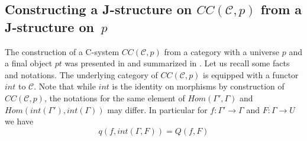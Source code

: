 \documentclass[12pt]{article}
\numberwithin{equation}{section}
\newenvironment{eq}{\begin{equation}}{\end{equation}}
\newcommand{\llabel}[1]{\label{#1}}
\newcommand{\sr}{\rightarrow}
\newcommand{\toCC}{CC} %
\begin{document}
\subsection{Constructing a J-structure on $\toCC({\mathcal C},p)$ from a J-structure on~$p$}
%
The construction of a C-system $\toCC({\mathcal C},p)$ from a category with a
universe $p$ and a final object $pt$ was presented in \cite{Cfromauniverse} and
summarized in \cite{fromunivwithPi}. Let us recall some facts and
notations. The underlying category of $\toCC({\mathcal C},p)$ is equipped with a
functor $int$ to $\mathcal C$. Note that while $int$ is the identity on
morphisms by construction of $\toCC({\mathcal C},p)$, the notations for the same
element of $Hom(\Gamma',\Gamma)$ and $Hom(int(\Gamma'),int(\Gamma))$ may
differ. In particular for $f:\Gamma'\sr \Gamma$ and $F:\Gamma\sr U$ we have
%
\begin{eq}
\llabel{2015.04.02.eq2} q(f,int(\Gamma,F))=Q(f,F)
\end{eq}
%
\end{document}

